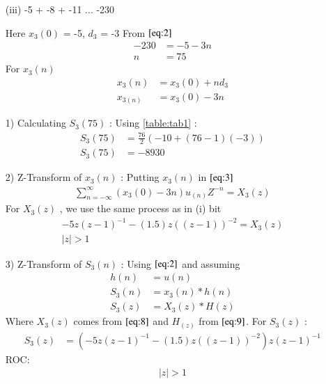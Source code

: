 \documentclass[journal,12pt,twocolumn]{IEEEtran}
\theoremstyle{remark}
\begin{document}
\begin{enumerate}
\vspace{1.5cm} 
\item[(iii)]
-5 + -8 + -11 ... -230
\vspace{0.2cm}

Here $x_3(0)$ = -5, $d_3$ = -3\vspace{0.05cm}
From $\eqref{eq:2}$
\begin{align}
-230 &= -5 -3n \\
n &= 75
\end{align}
For $x_3(n)$
\begin{align}
x_3(n) &= x_3(0) + nd_3\\
x_{3(n)} &= x_3(0) - 3n
\end{align}


\item[1)]
Calculating $S_3(75)$ :
Using \ref{table:tab1} :\vspace{0.05cm}
\begin{align}
    S_3(75) &= \frac{76}{2}(-10+(76-1)(-3))\\
   S_3(75) &= -8930
    \end{align}

\item[2)] 
Z-Transform of $x_3(n)$ :
Putting $x_3(n)$ in $\eqref{eq:3}$
\vspace{0.05cm}
\begin{align}
\sum_{n=-\infty}^{\infty}(x_3(0) -3n)u_{(n)}Z^{-n} =X_3(z)
\end{align}
For $X_3(z)$ , we use the same process as in (i) bit\vspace{0.05cm}
\begin{align}
 -5z(z-1)^{-1}-
       (1.5)z((z-1))^{-2}=X_3(z) \label{eq:8}\\
           \lvert z\rvert  >  1 
\end{align}

    \vspace{0.7cm}
\item[3)]
Z-Transform of $S_3(n)$ :
Using $\eqref{eq:2}$ and assuming 
\begin{align}
         h(n) &= u(n) \\
    S_3(n) &= x_3(n) * h(n) \\
    S_3(z) &= X_3(z) * H(z)
    \end{align}
    Where $X_3(z)$ comes from $\eqref{eq:8}$ and $H_(z)$ from $\eqref{eq:9}$.
    \vspace{0.05cm}
    For $S_3(z)$ :
    \begin{align}
            S_3(z) &= (-5z(z-1)^{-1}-
       (1.5)z((z-1))^{-2})z(z-1)^{-1}
    \end{align}
    ROC:
    \begin{align} 
    \lvert z \rvert > 1
    \end{align}
    

\end{enumerate}
\end{document}
